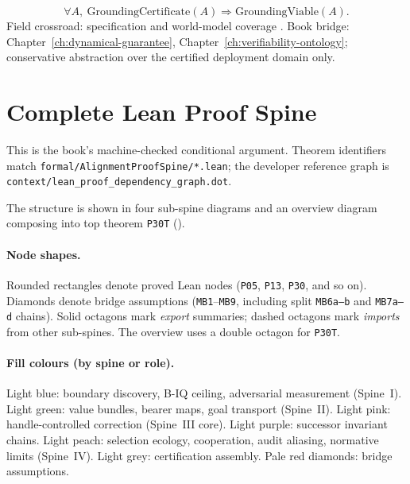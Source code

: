 \begin{assumption}
\label{appi:ass:mb9}
\begin{equation}
\label{appi:eq:mb9}
\forall A,\ \mathrm{GroundingCertificate}(A)\Rightarrow \mathrm{GroundingViable}(A).
\end{equation}
Field crossroad: specification and world-model coverage \autocite{dalrymple2024gsai}.
Book bridge: Chapter~\ref{ch:dynamical-guarantee}, Chapter~\ref{ch:verifiability-ontology}; conservative abstraction over the certified deployment domain only.
\end{assumption}

\section{Complete Lean Proof Spine}
\label{sec:appi-proof-dependency}

This is the book's machine-checked conditional argument.
Theorem identifiers match \texttt{formal/AlignmentProofSpine/*.lean}; the developer reference graph is \texttt{context/lean\_proof\_dependency\_graph.dot}.

\providecommand{\spinenewbadge}{\begingroup\fboxsep=1pt\fcolorbox{blue!70!black}{blue!6}{\scriptsize\textsf{NEW}}\endgroup}
\providecommand{\spinesubsumedbadge}{\begingroup\fboxsep=1pt\fcolorbox{green!45!black}{green!6}{\scriptsize\textsf{SUBSUMED}}\endgroup}
\providecommand{\spineimportedbadge}{\begingroup\fboxsep=1pt\fcolorbox{orange!70!black}{orange!8}{\scriptsize\textsf{IMPORTED}}\endgroup}

The structure is shown in four sub-spine diagrams and an overview diagram composing into top theorem \texttt{P30T} ().

\paragraph{Node shapes.}
Rounded rectangles denote proved Lean nodes (\texttt{P05}, \texttt{P13}, \texttt{P30}, and so on).
Diamonds denote bridge assumptions (\texttt{MB1}--\texttt{MB9}, including split \texttt{MB6a--b} and \texttt{MB7a--d} chains).
Solid octagons mark \emph{export} summaries; dashed octagons mark \emph{imports} from other sub-spines.
The overview uses a double octagon for \texttt{P30T}.

\paragraph{Fill colours (by spine or role).}
Light blue: boundary discovery, B-IQ ceiling, adversarial measurement (Spine~I).
Light green: value bundles, bearer maps, goal transport (Spine~II).
Light pink: handle-controlled correction (Spine~III core).
Light purple: successor invariant chains.
Light peach: selection ecology, cooperation, audit aliasing, normative limits (Spine~IV).
Light grey: certification assembly.
Pale red diamonds: bridge assumptions.

